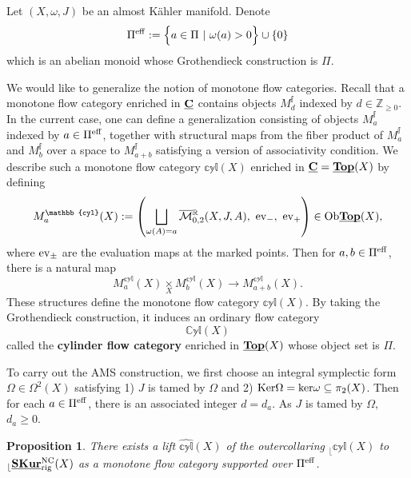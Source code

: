 \documentclass[reqno, 10pt]{amsart}
\numberwithin{equation}{section}
\numberwithin{equation}{section}
\renewcommand{\subset}{\subseteq}
\newtheorem{prop}[thm]{Proposition}
\theoremstyle{definition}
\theoremstyle{remark}
\newcommand{\beqn}{\begin{equation*}}
\newcommand{\eeqn}{\end{equation*}}
\newcommand{\ov}{\overline}
\newcommand{\mb}{\mathbb}
\newcommand{\mc}{\mathcal}
\renewcommand{\outer}{{}_{\lfloor}}
\newcommand{\wh}{\widehat}
\newcommand{\uds}[1]{\underline{\smash{#1}}}
\newcommand{\ev}{{\rm ev}}
\begin{document}
Let $(X, \omega, J)$ be an almost K\"ahler manifold. Denote
\beqn
\Pi^{\rm eff}:= \Big\{ a \in \Pi\ |\ \omega(a) > 0 \Big\} \cup \{0\}
\eeqn
which is an abelian monoid whose Grothendieck construction is $\Pi$. 

We would like to generalize the notion of monotone flow categories. Recall that a monotone flow category enriched in $\uds {\bf C}$ contains objects $M_d^{\mb f}$ indexed by $d \in {\mb Z}_{\geq 0}$. In the current case, one can define a generalization consisting of objects $M_a^{\mb f}$ indexed by $a\in \Pi^{\rm eff}$, together with structural maps from the fiber product of $M_a^{\mb f}$ and  $M_b^{\mb f}$ over a space to $M_{a+b}^{\mb f}$ satisfying a version of associativity condition. We describe such a monotone flow category $\mb{cyl}(X)$ enriched in $\uds{\bf C} = \uds{\bf Top}(X)$ by defining
\beqn
M_a^{\mb{cyl}}(X):= \left( \bigsqcup_{\omega(A) = a} \ov{\mc M}{}_{0,2}^{\mb R}(X, J, A),\ \ev_-, \ \ev_+ \right) \in {\rm Ob} \uds{\bf Top}(X),
\eeqn
where $\ev_{\pm}$ are the evaluation maps at the marked points. Then for $a, b \in \Pi^{\rm eff}$, there is a natural map
\beqn
M_a^{\mb{cyl} }(X) \underset{X}{\times} M_b^{\mb{cyl} }(X) \to M_{a + b}^{\mb{cyl} }(X).
\eeqn
These structures define the monotone flow category $\mb{cyl}(X)$. By taking the Grothendieck construction, it induces an ordinary flow category
\beqn
\mb{Cyl}(X)
\eeqn
called the {\bf cylinder flow category} enriched in $\uds{\bf Top}(X)$ whose object set is $\Pi$.



To carry out the AMS construction, we first choose an integral symplectic form $\Omega \in \Omega^2(X)$ satisfying 1) $J$ is tamed by $\Omega$ and 2) ${\rm Ker} \Omega = {\rm ker} \omega\subset \pi_2(X)$. Then for each $a \in \Pi^{\rm eff}$, there is an associated integer $d = d_a$. As $J$ is tamed by $\Omega$, $d_a \geq 0$.

\begin{prop}\label{prop215}
There exists a lift $\wh{\mb{cyl}}  (X)$ of the outercollaring $\outer \mb{cyl}  (X)$ to $\outer \uds{\bf SKur}^{\rm NC}_{\rm rig}(X)$ as a monotone flow category supported over $\Pi^{\rm eff}$.
\end{prop}
\end{document}
